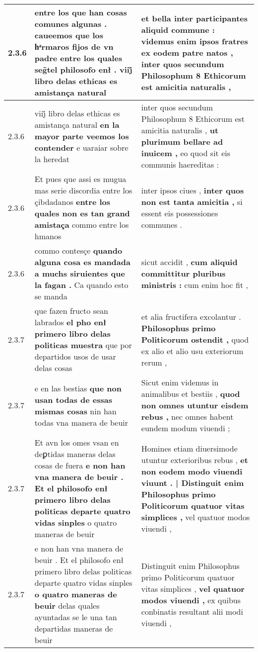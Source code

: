 \begin{tabular}{|p{1cm}|p{6.5cm}|p{6.5cm}|}
2.3.6 & entre los que han cosas comunes algunas . \textbf{ caueemos que los hͣrmaros fijos de vn padre entre los quales seg̃tel philosofo enł . } viij̊ libro delas ethicas es amistança natural & et bella inter participantes aliquid commune : videmus enim ipsos fratres \textbf{ ex eodem patre natos , } inter quos secundum Philosophum 8 Ethicorum est amicitia naturalis , \\\hline
2.3.6 & viij̊ libro delas ethicas es amistança natural \textbf{ en la mayor parte veemos los contender } e uaraiar sobre la heredat & inter quos secundum Philosophum 8 Ethicorum est amicitia naturalis , \textbf{ ut plurimum bellare ad inuicem , } eo quod sit eis communis haereditas : \\\hline
2.3.6 & Et pues que assi es mugua mas serie discordia entre los çibdadanos \textbf{ entre los quales non es tan grand amistaça } commo entre los hmanos & inter ipsos ciues , \textbf{ inter quos non est tanta amicitia , } si essent eis possessiones communes . \\\hline
2.3.6 & commo contesçe \textbf{ quando alguna cosa es mandada a muchs siruientes que la fagan . } Ca quando esto se manda & sicut accidit , \textbf{ cum aliquid committitur pluribus ministris : } cum enim hoc fit , \\\hline
2.3.7 & que fazen fructo sean labrados \textbf{ el pho enł primero libro delas politicas muestra } que por departidos usos de usar delas cosas & et alia fructifera excolantur . \textbf{ Philosophus primo Politicorum ostendit , } quod ex alio et alio usu exteriorum rerum , \\\hline
2.3.7 & e en las bestias \textbf{ que non usan todas de essas mismas cosas } nin han todas vna manera de beuir & Sicut enim videmus in animalibus et bestiis , \textbf{ quod non omnes utuntur eisdem rebus , } nec omnes habent eundem modum viuendi ; \\\hline
2.3.7 & Et avn los omes vsan en deꝑtidas maneras delas cosas de fuera \textbf{ e non han vna manera de beuir . Et el philosofo enł primero libro delas politicas departe quatro vidas sinples } o quatro maneras de beuir & Homines etiam diuersimode utuntur exterioribus rebus , \textbf{ et non eodem modo viuendi viuunt . | Distinguit enim Philosophus primo Politicorum quatuor vitas simplices , } vel quatuor modos viuendi , \\\hline
2.3.7 & e non han vna manera de beuir . Et el philosofo enł primero libro delas politicas departe quatro vidas sinples \textbf{ o quatro maneras de beuir } delas quales ayuntadas se le una tan departidas maneras de beuir & Distinguit enim Philosophus primo Politicorum quatuor vitas simplices , \textbf{ vel quatuor modos viuendi , } ex quibus conbinatis resultant alii modi viuendi , \\\hline

\end{tabular}

